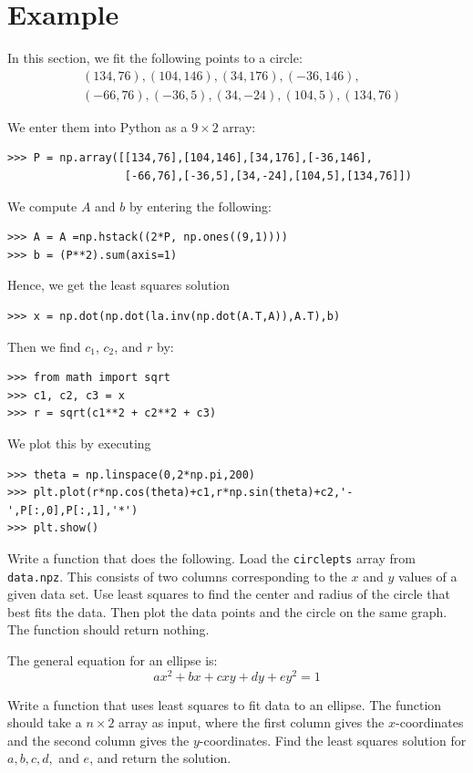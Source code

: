\section*{Example}

In this section, we fit the following points to a circle:
\begin{align*}
&(134,76),(104,146),(34,176),(-36,146),\\
&(-66,76),(-36,5),(34,-24),(104,5),(134,76)
\end{align*}

We enter them into Python as a $9\times 2$ array:
\begin{lstlisting}
>>> P = np.array([[134,76],[104,146],[34,176],[-36,146],
                  [-66,76],[-36,5],[34,-24],[104,5],[134,76]])
\end{lstlisting}
We compute $A$ and $b$ by entering the following:
\begin{lstlisting}
>>> A = A =np.hstack((2*P, np.ones((9,1))))
>>> b = (P**2).sum(axis=1)
\end{lstlisting}
Hence, we get the least squares solution
\begin{lstlisting}
>>> x = np.dot(np.dot(la.inv(np.dot(A.T,A)),A.T),b)
\end{lstlisting}
Then we find $c_1$, $c_2$, and $r$ by:
\begin{lstlisting}
>>> from math import sqrt
>>> c1, c2, c3 = x
>>> r = sqrt(c1**2 + c2**2 + c3)
\end{lstlisting}
We plot this by executing
\begin{lstlisting}
>>> theta = np.linspace(0,2*np.pi,200)
>>> plt.plot(r*np.cos(theta)+c1,r*np.sin(theta)+c2,'-',P[:,0],P[:,1],'*')
>>> plt.show()
\end{lstlisting}


\begin{problem}
Write a function  that does the following.
Load the \texttt{circlepts} array from \texttt{data.npz}.
This consists of two columns corresponding to the $x$ and $y$ values of a given data set.  Use least squares to find the center and radius of the circle that best fits the data.  Then plot the data points and the circle on the same graph.
The function should return nothing.
\end{problem}

\begin{problem}
The general equation for an ellipse is:
\[
ax^2 + bx + cxy + dy + ey^2 = 1
\]

Write a function  that uses least squares to fit data to an ellipse. 
The function should take a $n\times 2$ array as input, where the first column gives the $x$-coordinates
and the second column gives the $y$-coordinates. Find the least squares solution for $a, b, c, d,$ and $e$,
and return the solution.
\end{problem}

